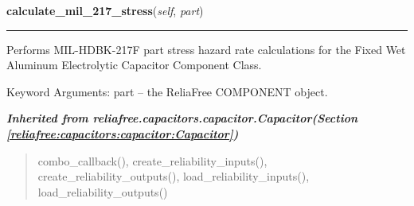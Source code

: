 \hspace{.8\funcindent}\begin{boxedminipage}{\funcwidth}

    \raggedright \textbf{calculate\_mil\_217\_stress}(\textit{self}, \textit{part})

    \vspace{-1.5ex}

    \rule{\textwidth}{0.5\fboxrule}
\setlength{\parskip}{2ex}
    Performs MIL-HDBK-217F part stress hazard rate calculations for the 
    Fixed Wet Aluminum Electrolytic Capacitor Component Class.

    Keyword Arguments: part -- the ReliaFree COMPONENT object.

\setlength{\parskip}{1ex}
    \end{boxedminipage}


\large{\textbf{\textit{Inherited from reliafree.capacitors.capacitor.Capacitor\textit{(Section \ref{reliafree:capacitors:capacitor:Capacitor})}}}}

\begin{quote}
combo\_callback(), create\_reliability\_inputs(), create\_reliability\_outputs(), load\_reliability\_inputs(), load\_reliability\_outputs()
\end{quote}
